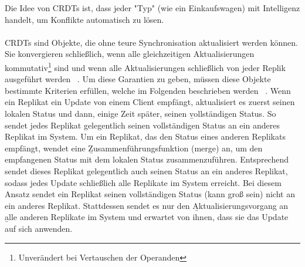 %
%
%
%
%
%
%
%
%
%
%
Die Idee von \glspl{CRDT} ist, dass jeder "Typ" (wie ein Einkaufswagen) mit Intelligenz handelt, um Konflikte automatisch zu lösen.\\\\
CRDTs sind Objekte, die ohne teure Synchronisation aktualisiert werden können. Sie konvergieren schließlich, wenn alle gleichzeitigen Aktualisierungen kommutativ\footnote{Unverändert bei Vertauschen der Operanden} sind und wenn alle Aktualisierungen schließlich von jeder Replik ausgeführt werden ~\cite{crdt_shapiro}.
Um diese Garantien zu geben, müssen diese Objekte bestimmte Kriterien erfüllen, welche im Folgenden beschrieben werden ~\cite{crdt_shapiro2}.
Wenn ein Replikat ein Update von einem Client empfängt, aktualisiert es zuerst seinen lokalen Status und dann, einige Zeit später, seinen \b{vollständigen Status}. So sendet jedes Replikat gelegentlich seinen vollständigen Status an ein anderes Replikat im System. Um ein Replikat, das den Status eines anderen Replikats empfängt, wendet eine \b{Zusammenführungsfunktion} (merge) an, um den empfangenen Status mit dem lokalen Status zusammenzuführen. Entsprechend sendet dieses Replikat gelegentlich auch seinen Status an ein anderes Replikat, sodass jedes Update schließlich alle Replikate im System erreicht.
Bei diesem Ansatz sendet ein Replikat seinen vollständigen Status (kann groß sein) nicht an ein anderes Replikat. Stattdessen sendet es nur den \b{Aktualisierungsvorgang} an \b{alle} anderen Replikate im System und erwartet von ihnen, dass sie das Update auf sich anwenden.\\
